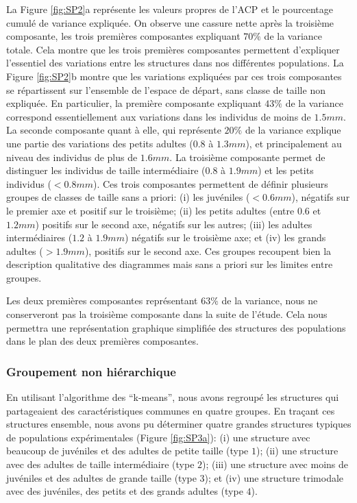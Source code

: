 La Figure \ref{fig:SP2}a représente les valeurs propres de l'ACP et le
pourcentage cumulé de variance expliquée. On observe une cassure nette après la
troisième composante, les trois premières composantes expliquant $70\%$ de la
variance totale. Cela montre que les trois premières composantes permettent
d'expliquer l'essentiel des variations entre les structures dans nos différentes
populations. La Figure \ref{fig:SP2}b montre que les variations expliquées
par ces trois composantes se répartissent sur l'ensemble de l'espace de départ,
sans classe de taille non expliquée.
En particulier, la première composante expliquant $43\%$ de la variance
correspond essentiellement aux variations dans les individus de moins de
$1.5mm$. La seconde composante quant à elle, qui représente $20\%$ de la
variance explique une partie des variations des petits adultes ($0.8$ à
$1.3mm$), et principalement au niveau des individus de plus de $1.6mm$. La troisième
composante permet de distinguer les individus de taille
intermédiaire ($0.8$ à $1.9mm$) et les petits individus ($<0.8mm$). Ces trois
composantes permettent de définir plusieurs groupes de classes de taille sans a
priori: (i) les juvéniles ($<0.6mm$), négatifs sur le premier axe et positif sur
le troisième; (ii) les petits adultes (entre $0.6$ et $1.2mm$) positifs sur le
second axe, négatifs sur les autres; (iii) les adultes intermédiaires ($1.2$ à
$1.9mm$) négatifs sur le troisième axe; et (iv) les grands adultes ($>1.9mm$),
positifs sur le second axe. Ces groupes recoupent bien la description
qualitative des diagrammes mais sans a priori sur les limites entre groupes.

Les deux premières composantes représentant $63\%$ de la variance, nous ne
conserveront pas la troisième composante dans la suite de l'étude. Cela nous
permettra une représentation graphique simplifiée des structures des populations
dans le plan des deux premières composantes. 

\subsubsection{Groupement non hiérarchique}

En utilisant l'algorithme des ``k-means'', nous avons regroupé les structures
qui partageaient des caractéristiques communes en quatre groupes. En traçant ces
structures ensemble, nous avons pu déterminer quatre grandes structures typiques
de populations expérimentales (Figure \ref{fig:SP3a}): (i) une
structure avec beaucoup de juvéniles et des adultes de petite taille (type $1$);
(ii) une structure avec des adultes de taille intermédiaire (type $2$); (iii)
une structure avec moins de juvéniles et des adultes de grande taille (type
$3$); et (iv) une structure trimodale avec des juvéniles, des petits et des
grands adultes (type $4$).

